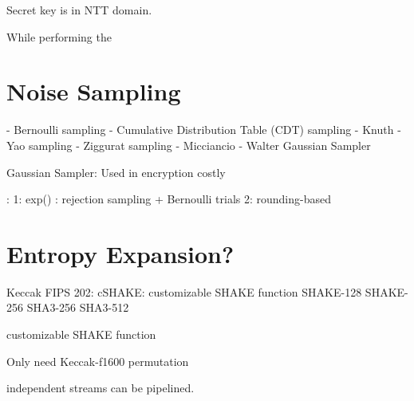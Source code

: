 Secret key is in NTT domain.


While performing the 

\section{Noise Sampling}

- Bernoulli sampling
- Cumulative Distribution Table (CDT) sampling
- Knuth
- Yao sampling
- Ziggurat sampling
- Micciancio
- Walter Gaussian Sampler


Gaussian Sampler:
Used in encryption
costly

\cite{poppelmann2014a} :
1: exp() : rejection sampling + Bernoulli trials
2: rounding-based \cite{devroye1986}

\section{Entropy Expansion?}
Keccak
FIPS 202:
cSHAKE: customizable SHAKE function
SHAKE-128 
SHAKE-256
SHA3-256
SHA3-512

customizable SHAKE function

Only need Keccak-f1600 permutation

independent streams can be pipelined.




